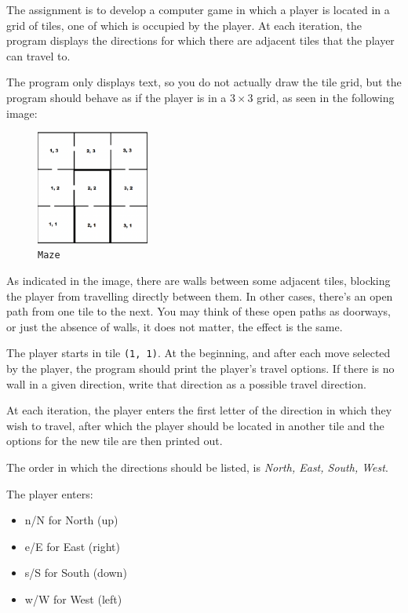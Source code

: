 
The assignment is to develop a computer game in which a player is located in a grid of tiles,
one of which is occupied by the player.
At each iteration, the program displays the directions
for which there are adjacent tiles that the player can travel to.

The program only displays text, so you do not actually draw the tile grid,
but the program should behave as if the player is in a $3 \times 3$ grid,
as seen in the following image:

\begin{figure}[h]
    \centering
    \includegraphics[width=0.33\textwidth]{maze}
    \caption{\texttt{Maze}}
\end{figure}

As indicated in the image, there are walls between some adjacent tiles,
blocking the player from travelling directly between them.
In other cases, there's an open path from one tile to the next.
You may think of these open paths as doorways, or just the absence of walls,
it does not matter, the effect is the same.

The player starts in tile \texttt{(1, 1)}.
At the beginning, and after each move selected by the player,
the program should print the player's travel options.
If there is no wall in a given direction,
write that direction as a possible travel direction.

At each iteration, the player enters the first letter of the direction in which they wish to travel,
after which the player should be located in another tile and the options for the new tile are then printed out.

The order in which the directions should be listed, is \emph{North, East, South, West}.

The player enters:
\begin{itemize}
    \item n/N for North (up)
    \item e/E for East (right)
    \item s/S for South (down)
    \item w/W for West (left)
\end{itemize}

